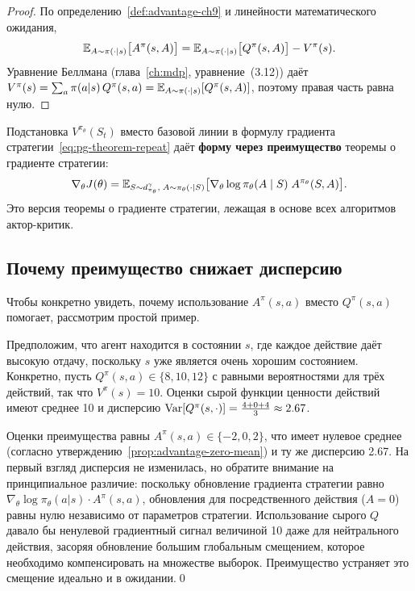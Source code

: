 \begin{proof}
По определению~\ref{def:advantage-ch9} и линейности математического ожидания,
\[
\operatorname{\mathbb{E}}_{A \sim \pi(\cdot|s)}\bigl[A^\pi(s, A)\bigr]
= \operatorname{\mathbb{E}}_{A \sim \pi(\cdot|s)}\bigl[Q^\pi(s, A)\bigr] - V^\pi(s).
\]
Уравнение Беллмана (глава~\ref{ch:mdp}, уравнение~(3.12)) даёт
$V^\pi(s) = \sum_a \pi(a|s)\,Q^\pi(s,a)
           = \operatorname{\mathbb{E}}_{A \sim \pi(\cdot|s)}[Q^\pi(s,A)]$,
поэтому правая часть равна нулю.
\end{proof}

Подстановка $V^{\pi_\theta}(S_t)$ вместо базовой линии в формулу градиента стратегии~\eqref{eq:pg-theorem-repeat} даёт \textbf{форму через преимущество} теоремы о градиенте стратегии:
\begin{equation}
\label{eq:advantage-pg}
\nabla_\theta J(\theta)
= \operatorname{\mathbb{E}}_{S \sim d^\gamma_{\pi_\theta},\; A \sim \pi_\theta(\cdot|S)}
  \bigl[\nabla_\theta \log \pi_\theta(A \mid S)\; A^{\pi_\theta}(S, A)\bigr].
\end{equation}
Это версия теоремы о градиенте стратегии, лежащая в основе всех алгоритмов актор-критик.

\subsection{Почему преимущество снижает дисперсию}

Чтобы конкретно увидеть, почему использование $A^\pi(s,a)$ вместо $Q^\pi(s,a)$ помогает, рассмотрим простой пример.

\begin{example}
\label{ex:advantage-variance}
Предположим, что агент находится в состоянии $s$, где каждое действие даёт высокую отдачу, поскольку $s$ уже является очень хорошим состоянием. Конкретно, пусть $Q^\pi(s, a) \in \{8, 10, 12\}$ с равными вероятностями для трёх действий, так что $V^\pi(s) = 10$. Оценки сырой функции ценности действий имеют среднее 10 и дисперсию $\operatorname{Var}[Q^\pi(s,\cdot)] = \frac{4+0+4}{3} \approx 2.67$.

Оценки преимущества равны $A^\pi(s,a) \in \{-2, 0, 2\}$, что имеет нулевое среднее (согласно утверждению~\ref{prop:advantage-zero-mean}) и ту же дисперсию 2.67. На первый взгляд дисперсия не изменилась, но обратите внимание на принципиальное различие: поскольку обновление градиента стратегии равно $\nabla_\theta \log \pi_\theta(a|s) \cdot A^\pi(s,a)$, обновления для посредственного действия ($A = 0$) равны нулю независимо от параметров стратегии. Использование сырого $Q$ давало бы ненулевой градиентный сигнал величиной 10 даже для нейтрального действия, засоряя обновление большим глобальным смещением, которое необходимо компенсировать на множестве выборок. Преимущество устраняет это смещение идеально и в ожидании.\qed
\end{example}

